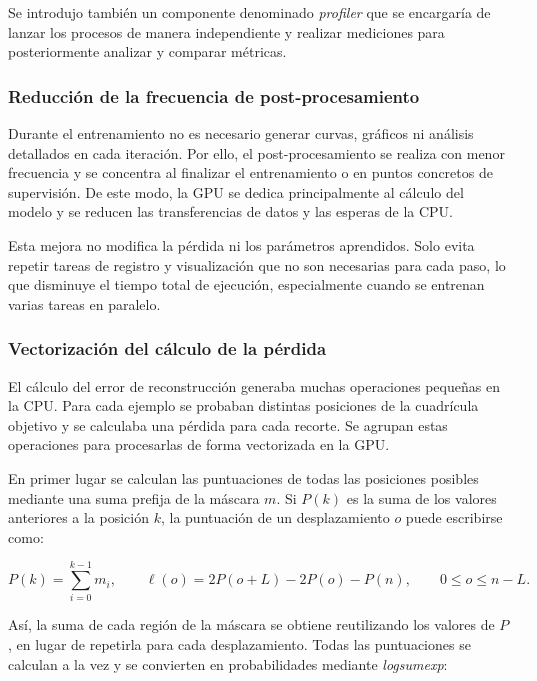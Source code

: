 \documentclass[11pt,a4paper,spanish]{book}
\numberwithin{equation}{chapter}
\numberwithin{figure}{chapter}
\begin{document}
Se introdujo también un componente denominado \textit{profiler} que se encargaría de lanzar los procesos de manera independiente y realizar
mediciones para posteriormente analizar y comparar métricas.

\subsubsection{Reducción de la frecuencia de post-procesamiento}

Durante el entrenamiento no es necesario generar curvas, gráficos ni análisis detallados en cada iteración. Por ello, el
post-procesamiento se realiza con menor frecuencia y se concentra al finalizar el entrenamiento o en puntos concretos de supervisión.
De este modo, la GPU se dedica principalmente al cálculo del modelo y se reducen las transferencias de datos y las esperas de la CPU.

Esta mejora no modifica la pérdida ni los parámetros aprendidos. Solo evita repetir tareas de registro y visualización que no son
necesarias para cada paso, lo que disminuye el tiempo total de ejecución, especialmente cuando se entrenan varias tareas en paralelo.

\subsubsection{Vectorización del cálculo de la pérdida}

El cálculo del error de reconstrucción generaba muchas operaciones pequeñas en la CPU. Para cada ejemplo se probaban distintas
posiciones de la cuadrícula objetivo y se calculaba una pérdida para cada recorte. Se agrupan estas operaciones para procesarlas de
forma vectorizada en la GPU.

En primer lugar se calculan las puntuaciones de todas las posiciones posibles mediante una suma prefija de la máscara $m$. Si $P(k)$
es la suma de los valores anteriores a la posición $k$, la puntuación de un desplazamiento $o$ puede escribirse como:

\begin{equation}
P(k)=\sum_{i=0}^{k-1}m_i,
\qquad
\ell(o)=2P(o+L)-2P(o)-P(n),
\qquad 0\leq o\leq n-L.
\label{eq:h1-perdida-vectorizada}
\end{equation}

Así, la suma de cada región de la máscara se obtiene reutilizando los valores de $P$, en lugar de repetirla para cada desplazamiento.
Todas las puntuaciones se calculan a la vez y se convierten en probabilidades mediante \textit{logsumexp}:
\end{document}
